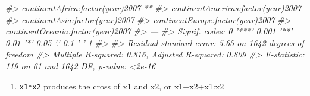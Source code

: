 \documentclass[]{book}
\newenvironment{Shaded}{\begin{snugshade}}{\end{snugshade}}
\newcommand{\CommentTok}[1]{\textcolor[rgb]{0.56,0.35,0.01}{\textit{#1}}}
\providecommand{\tightlist}{%
  \setlength{\itemsep}{0pt}\setlength{\parskip}{0pt}}
\begin{document}
\begin{Shaded}
\begin{Highlighting}[]
\CommentTok{#> continentAfrica:factor(year)2007   ** }
\CommentTok{#> continentAmericas:factor(year)2007    }
\CommentTok{#> continentAsia:factor(year)2007        }
\CommentTok{#> continentEurope:factor(year)2007      }
\CommentTok{#> continentOceania:factor(year)2007     }
\CommentTok{#> ---}
\CommentTok{#> Signif. codes:  0 '***' 0.001 '**' 0.01 '*' 0.05 '.' 0.1 ' ' 1}
\CommentTok{#> }
\CommentTok{#> Residual standard error: 5.65 on 1642 degrees of freedom}
\CommentTok{#> Multiple R-squared:  0.816,  Adjusted R-squared:  0.809 }
\CommentTok{#> F-statistic:  119 on 61 and 1642 DF,  p-value: <2e-16}
\end{Highlighting}
\end{Shaded}

\begin{enumerate}
\def\labelenumi{\arabic{enumi}.}
\setcounter{enumi}{1}
\tightlist
\item
  \texttt{x1*x2} produces the cross of x1 and x2, or x1+x2+x1:x2
\end{enumerate}
\end{document}

